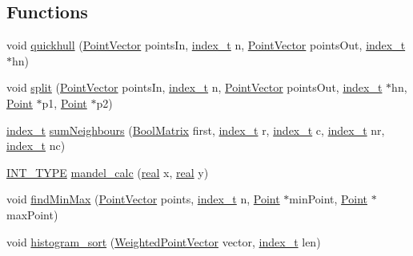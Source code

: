 \subsection*{Functions}
\begin{CompactItemize}
\item 
void \hyperlink{namespacecowichan__openmp_f261011870b201d556308f43b5b25b89}{quickhull} (\hyperlink{class_point}{PointVector} pointsIn, \hyperlink{cowichan_8hpp_5b04577d5d21124855deaad298595371}{index\_\-t} n, \hyperlink{class_point}{PointVector} pointsOut, \hyperlink{cowichan_8hpp_5b04577d5d21124855deaad298595371}{index\_\-t} $\ast$hn)
\item 
void \hyperlink{namespacecowichan__openmp_d31787f1b4c9d57119160411e96f769f}{split} (\hyperlink{class_point}{PointVector} pointsIn, \hyperlink{cowichan_8hpp_5b04577d5d21124855deaad298595371}{index\_\-t} n, \hyperlink{class_point}{PointVector} pointsOut, \hyperlink{cowichan_8hpp_5b04577d5d21124855deaad298595371}{index\_\-t} $\ast$hn, \hyperlink{class_point}{Point} $\ast$p1, \hyperlink{class_point}{Point} $\ast$p2)
\item 
\hyperlink{cowichan_8hpp_5b04577d5d21124855deaad298595371}{index\_\-t} \hyperlink{namespacecowichan__openmp_a4ce5b0ba78cd9480bf45e7c313f59d1}{sumNeighbours} (\hyperlink{cowichan_8hpp_a64c8df2f1e9c8ea68a7bcc19aca683e}{BoolMatrix} first, \hyperlink{cowichan_8hpp_5b04577d5d21124855deaad298595371}{index\_\-t} r, \hyperlink{cowichan_8hpp_5b04577d5d21124855deaad298595371}{index\_\-t} c, \hyperlink{cowichan_8hpp_5b04577d5d21124855deaad298595371}{index\_\-t} nr, \hyperlink{cowichan_8hpp_5b04577d5d21124855deaad298595371}{index\_\-t} nc)
\item 
\hyperlink{cowichan_8hpp_c96945095fd0ce7186a1d00a89f77d2c}{INT\_\-TYPE} \hyperlink{namespacecowichan__openmp_2753e3856bc41c61099c4702d789823e}{mandel\_\-calc} (\hyperlink{cowichan_8hpp_4d521b2c54a1f6312cc8fa04827eaf98}{real} x, \hyperlink{cowichan_8hpp_4d521b2c54a1f6312cc8fa04827eaf98}{real} y)
\item 
void \hyperlink{namespacecowichan__openmp_e96598e37e2b937c861c5bc93eda77b8}{findMinMax} (\hyperlink{class_point}{PointVector} points, \hyperlink{cowichan_8hpp_5b04577d5d21124855deaad298595371}{index\_\-t} n, \hyperlink{class_point}{Point} $\ast$minPoint, \hyperlink{class_point}{Point} $\ast$maxPoint)
\item 
void \hyperlink{namespacecowichan__openmp_9cbb3540b84f4e051f072a08c2c1d5db}{histogram\_\-sort} (\hyperlink{class_weighted_point}{WeightedPointVector} vector, \hyperlink{cowichan_8hpp_5b04577d5d21124855deaad298595371}{index\_\-t} len)

\end{CompactItemize}
